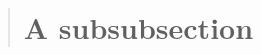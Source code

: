 \documentclass{book}
\begin{document}
\begin{quote}
\section*{A subsubsection}
\end{quote}
\end{document}
